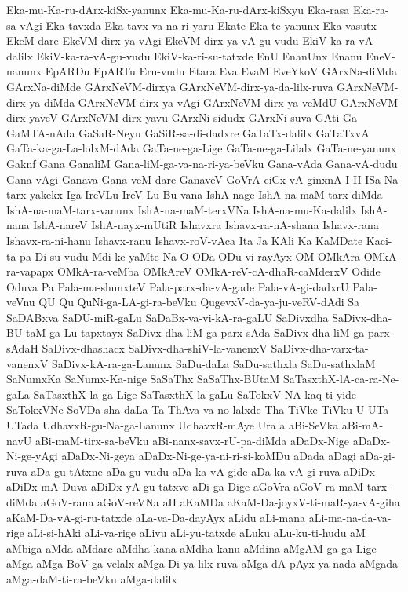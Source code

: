 {Eka-mu-Ka-ru-dArx-kiSx-yanunx
Eka-mu-Ka-ru-dArx-kiSxyu
Eka-rasa
Eka-ra-sa-vAgi
Eka-tavxda
Eka-tavx-va-na-ri-yaru
Ekate
Eka-te-yanunx
Eka-vasutx
EkeM-dare
EkeVM-dirx-ya-vAgi
EkeVM-dirx-ya-vA-gu-vudu
EkiV-ka-ra-vA-dalilx
EkiV-ka-ra-vA-gu-vudu
EkiV-ka-ri-su-tatxde
EnU
EnanUnx
Enanu
EneV-nanunx
EpARDu
EpARTu
Eru-vudu
Etara
Eva
EvaM
EveYkoV
GArxNa-diMda
GArxNa-diMde
GArxNeVM-dirxya
GArxNeVM-dirx-ya-da-lilx-ruva
GArxNeVM-dirx-ya-diMda
GArxNeVM-dirx-ya-vAgi
GArxNeVM-dirx-ya-veMdU
GArxNeVM-dirx-yaveV
GArxNeVM-dirx-yavu
GArxNi-sidudx
GArxNi-suva
GAti
Ga
GaMTA-nAda
GaSaR-Neyu
GaSiR-sa-di-dadxre
GaTaTx-dalilx
GaTaTxvA
GaTa-ka-ga-La-lolxM-dAda
GaTa-ne-ga-Lige
GaTa-ne-ga-Lilalx
GaTa-ne-yanunx
Gaknf
Gana
GanaliM
Gana-liM-ga-va-na-ri-ya-beVku
Gana-vAda
Gana-vA-dudu
Gana-vAgi
Ganava
Gana-veM-dare
GanaveV
GoVrA-ciCx-vA-ginxnA
I
II
ISa-Na-tarx-yakekx
Iga
IreVLu
IreV-Lu-Bu-vana
IshA-nage
IshA-na-maM-tarx-diMda
IshA-na-maM-tarx-vanunx
IshA-na-maM-terxVNa
IshA-na-mu-Ka-dalilx
IshA-nana
IshA-nareV
IshA-nayx-mUtiR
Ishavxra
Ishavx-ra-nA-shana
Ishavx-rana
Ishavx-ra-ni-hanu
Ishavx-ranu
Ishavx-roV-vAca
Ita
Ja
KAli
Ka
KaMDate
Kaci-ta-pa-Di-su-vudu
Mdi-ke-yaMte
Na
O
ODa
ODu-vi-rayAyx
OM
OMkAra
OMkA-ra-vapapx
OMkA-ra-veMba
OMkAreV
OMkA-reV-cA-dhaR-caMderxV
Odide
Oduva
Pa
Pala-ma-shunxteV
Pala-parx-da-vA-gade
Pala-vA-gi-dadxrU
Pala-veVnu
QU
Qu
QuNi-ga-LA-gi-ra-beVku
QugevxV-da-ya-ju-veRV-dAdi
Sa
SaDABxva
SaDU-miR-gaLu
SaDaBx-va-vi-kA-ra-gaLU
SaDivxdha
SaDivx-dha-BU-taM-ga-Lu-tapxtayx
SaDivx-dha-liM-ga-parx-sAda
SaDivx-dha-liM-ga-parx-sAdaH
SaDivx-dhashacx
SaDivx-dha-shiV-la-vanenxV
SaDivx-dha-varx-ta-vanenxV
SaDivx-kA-ra-ga-Lanunx
SaDu-daLa
SaDu-sathxla
SaDu-sathxlaM
SaNumxKa
SaNumx-Ka-nige
SaSaThx
SaSaThx-BUtaM
SaTasxthX-lA-ca-ra-Ne-gaLa
SaTasxthX-la-ga-Lige
SaTasxthX-la-gaLu
SaTokxV-NA-kaq-ti-yide
SaTokxVNe
SoVDa-sha-daLa
Ta
ThAva-va-no-lalxde
Tha
TiVke
TiVku
U
UTa
UTada
UdhavxR-gu-Na-ga-Lanunx
UdhavxR-mAye
Ura
a
aBi-SeVka
aBi-mA-navU
aBi-maM-tirx-sa-beVku
aBi-nanx-savx-rU-pa-diMda
aDaDx-Nige
aDaDx-Ni-ge-yAgi
aDaDx-Ni-geya
aDaDx-Ni-ge-ya-ni-ri-si-koMDu
aDada
aDagi
aDa-gi-ruva
aDa-gu-tAtxne
aDa-gu-vudu
aDa-ka-vA-gide
aDa-ka-vA-gi-ruva
aDiDx
aDiDx-mA-Duva
aDiDx-yA-gu-tatxve
aDi-ga-Dige
aGoVra
aGoV-ra-maM-tarx-diMda
aGoV-rana
aGoV-reVNa
aH
aKaMDa
aKaM-Da-joyxV-ti-maR-ya-vA-giha
aKaM-Da-vA-gi-ru-tatxde
aLa-va-Da-dayAyx
aLidu
aLi-mana
aLi-ma-na-da-va-rige
aLi-si-hAki
aLi-va-rige
aLivu
aLi-yu-tatxde
aLuku
aLu-ku-ti-hudu
aM
aMbiga
aMda
aMdare
aMdha-kana
aMdha-kanu
aMdina
aMgAM-ga-ga-Lige
aMga
aMga-BoV-ga-velalx
aMga-Di-ya-lilx-ruva
aMga-dA-pAyx-ya-nada
aMgada
aMga-daM-ti-ra-beVku
aMga-dalilx
}
